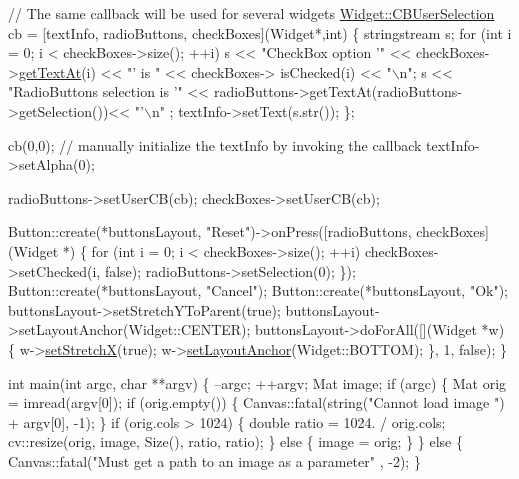 \begin{DoxyCode}
    \textcolor{comment}{// The same callback will be used for several widgets}
    \hyperlink{classcanvascv_1_1Widget_a977cbd39cf203c5866f07f3645c7e4bc}{Widget::CBUserSelection} cb = [textInfo, radioButtons, checkBoxes](Widget*,int)
    \{
        stringstream s;
        \textcolor{keywordflow}{for} (\textcolor{keywordtype}{int} i = 0; i < checkBoxes->size(); ++i)
            s << \textcolor{stringliteral}{"CheckBox option '"} << checkBoxes->\hyperlink{classcanvascv_1_1CheckBoxes_a1ca004ddd840090415924b1f79b2ee47}{getTextAt}(i) << \textcolor{stringliteral}{"' is "} << checkBoxes->
      isChecked(i) << \textcolor{stringliteral}{"\(\backslash\)n"};
        s << \textcolor{stringliteral}{"RadioButtons selection is '"} << radioButtons->getTextAt(radioButtons->getSelection())<< \textcolor{stringliteral}{"'\(\backslash\)n"}
      ;
        textInfo->setText(s.str());
    \};

    cb(0,0); \textcolor{comment}{// manually initialize the textInfo by invoking the callback}
    textInfo->setAlpha(0);

    radioButtons->setUserCB(cb);
    checkBoxes->setUserCB(cb);

    Button::create(*buttonsLayout, \textcolor{stringliteral}{"Reset"})->onPress([radioButtons, checkBoxes](Widget *)
    \{
        \textcolor{keywordflow}{for} (\textcolor{keywordtype}{int} i = 0; i < checkBoxes->size(); ++i)
            checkBoxes->setChecked(i, \textcolor{keyword}{false});
        radioButtons->setSelection(0);
    \});
    Button::create(*buttonsLayout, \textcolor{stringliteral}{"Cancel"});
    Button::create(*buttonsLayout, \textcolor{stringliteral}{"Ok"});
    buttonsLayout->setStretchYToParent(\textcolor{keyword}{true});
    buttonsLayout->setLayoutAnchor(Widget::CENTER);
    buttonsLayout->doForAll([](Widget *w)
    \{
        w->\hyperlink{classcanvascv_1_1Widget_a7cdddebd755c499712793f727a057733}{setStretchX}(\textcolor{keyword}{true});
        w->\hyperlink{classcanvascv_1_1Widget_a7180ca0054874c853e805e7842741596}{setLayoutAnchor}(Widget::BOTTOM);
    \}, 1, \textcolor{keyword}{false});
\}

\textcolor{keywordtype}{int} main(\textcolor{keywordtype}{int} argc, \textcolor{keywordtype}{char} **argv)
\{
    --argc;
    ++argv;
    Mat image;
    \textcolor{keywordflow}{if} (argc)
    \{
        Mat orig = imread(argv[0]);
        \textcolor{keywordflow}{if} (orig.empty())
        \{
            Canvas::fatal(\textcolor{keywordtype}{string}(\textcolor{stringliteral}{"Cannot load image "}) + argv[0], -1);
        \}
        \textcolor{keywordflow}{if} (orig.cols > 1024)
        \{
            \textcolor{keywordtype}{double} ratio = 1024. / orig.cols;
            cv::resize(orig, image, Size(), ratio, ratio);
        \}
        \textcolor{keywordflow}{else}
        \{
            image = orig;
        \}
    \}
    \textcolor{keywordflow}{else}
    \{
        Canvas::fatal(\textcolor{stringliteral}{"Must get a path to an image as a parameter"} , -2);
    \}


\end{DoxyCode}
